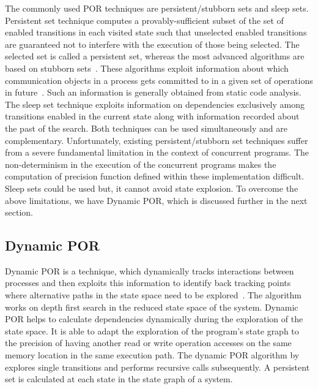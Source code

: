The commonly used POR techniques are persistent/stubborn sets and sleep sets. 
Persistent set technique computes a provably-sufficient subset of the set of enabled transitions in each visited state such that unselected enabled transitions are guaranteed not to interfere with the execution of those being selected. 
The selected set is called a persistent set, 
whereas the most advanced algorithms are based on stubborn sets~\citep{dynamic_por}. 
These algorithms exploit information about which communication objects in a process gets committed to in a given set of operations in future~\citep{dynamic_por}. 
Such an information is generally obtained from static code analysis. 
The sleep set technique exploits information on dependencies exclusively among transitions enabled in the current state along with information recorded about the past of the search. 
Both techniques can be used simultaneously and are complementary. 
Unfortunately, existing persistent/stubborn set techniques suffer from a severe fundamental limitation in the context of concurrent programs. 
The non-determinism in the execution of the concurrent programs makes the computation of precision function defined within these implementation difficult. 
Sleep sets could be used but, it cannot avoid state explosion. 
To overcome the above limitations, we have Dynamic POR, which is discussed further in the next section. 

\subsection{Dynamic POR}

Dynamic POR is a technique, which dynamically tracks interactions between processes and then exploits this information to identify back tracking points where alternative paths in the state space need to be explored~\citep{dynamic_por}. 
The algorithm works on depth first search in the reduced state space of the system. 
Dynamic POR helps to calculate dependencies dynamically during the exploration of the state space. 
It is able to adapt the exploration of the program's state graph to the precision of having another read or write operation accesses on the same memory location in the same execution path. 
The dynamic POR algorithm by \citet{dynamic_por} explores single transitions and performs recursive calls subsequently. 
A persistent set is calculated at each state in the state graph of a system.

